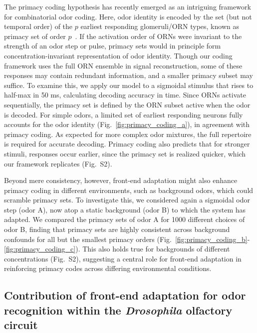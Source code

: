 \documentclass[10pt,prl,aps,showpacs,twocolumn,unsortedaddress]{revtex4-1}
\begin{document}
The primacy coding hypothesis has recently emerged as an intriguing framework for combinatorial odor coding. Here, odor identity is encoded by the set (but not temporal order) of the $p$ earliest responding glomeruli/ORN types, known as primacy set of order $p$~\cite{primacy_coding}. If the activation order of ORNs were invariant to the strength of an odor step or pulse, primacy sets would in principle form concentration-invariant representation of odor identity. Though our coding framework uses the full ORN ensemble in signal reconstruction, some of these responses may contain redundant information, and a smaller primacy subset may suffice. To examine this, we apply our model to a sigmoidal stimulus that rises to half-max in 50 ms, calculating decoding accuracy in time. Since ORNs activate sequentially, the primacy set is defined by the ORN subset active when the odor is decoded. For simple odors, a limited set of earliest responding neurons fully accounts for the odor identity (Fig.~\ref{fig:primacy_coding_a}), in agreement with primacy coding. As expected for more complex odor mixtures, the full repertoire is required for accurate decoding. Primacy coding also predicts that for stronger stimuli, responses occur earlier, since the primacy set is realized quicker, which our framework replicates (Fig.~S2).

Beyond mere consistency, however, front-end adaptation might also enhance primacy coding in different environments, such as background odors, which could scramble primacy sets. To investigate this, we considered again a sigmoidal odor step (odor A), now atop a static background (odor B) to which the system has adapted. We compared the primacy sets of odor A for 1000 different choices of odor B, finding that primacy sets are highly consistent across background confounds for all but the smallest primacy orders (Fig.~\ref{fig:primacy_coding_b}-\ref{fig:primacy_coding_c}). This also holds true for backgrounds of different concentrations (Fig.~S2), suggesting a central role for front-end adaptation in reinforcing primacy codes across differing environmental conditions. 


\subsection*{Contribution of front-end adaptation for odor recognition within the \textit{Drosophila} olfactory circuit}
\end{document}
